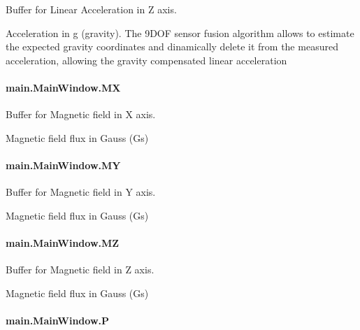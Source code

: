 Buffer for Linear Acceleration in Z axis. 

Acceleration in g (gravity). The 9\-D\-O\-F sensor fusion algorithm allows to estimate the expected gravity coordinates and dinamically delete it from the measured acceleration, allowing the gravity compensated linear acceleration \hypertarget{classmain_1_1_main_window_a6ab8008a1a68f64ee8b6598a98654812}{
\paragraph[{M\-X}]{\setlength{\rightskip}{0pt plus 5cm}main.\-Main\-Window.\-M\-X}}\label{classmain_1_1_main_window_a6ab8008a1a68f64ee8b6598a98654812}


Buffer for Magnetic field in X axis. 

Magnetic field flux in Gauss (Gs) \hypertarget{classmain_1_1_main_window_aba40307f35350f664481c72b034e7bf8}{
\paragraph[{M\-Y}]{\setlength{\rightskip}{0pt plus 5cm}main.\-Main\-Window.\-M\-Y}}\label{classmain_1_1_main_window_aba40307f35350f664481c72b034e7bf8}


Buffer for Magnetic field in Y axis. 

Magnetic field flux in Gauss (Gs) \hypertarget{classmain_1_1_main_window_a3f1d2bc16eb2b7a565f2784e4741be7b}{
\paragraph[{M\-Z}]{\setlength{\rightskip}{0pt plus 5cm}main.\-Main\-Window.\-M\-Z}}\label{classmain_1_1_main_window_a3f1d2bc16eb2b7a565f2784e4741be7b}


Buffer for Magnetic field in Z axis. 

Magnetic field flux in Gauss (Gs) \hypertarget{classmain_1_1_main_window_a9000507d15f50881c7cfbd1d562e0feb}{
\paragraph[{P}]{\setlength{\rightskip}{0pt plus 5cm}main.\-Main\-Window.\-P}}\label{classmain_1_1_main_window_a9000507d15f50881c7cfbd1d562e0feb}



